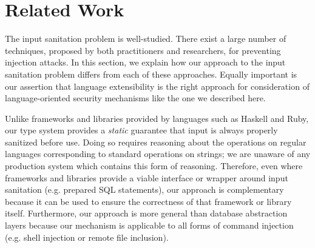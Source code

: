 \documentclass[10pt]{sigplanconf}
\theoremstyle{definition}
\begin{document}




\section{Related Work}\label{related}



The input sanitation problem is well-studied. There exist a large number of techniques, proposed by both practitioners and researchers, for preventing injection attacks. In this section, we explain how our approach to the input sanitation problem differs from each of these approaches. Equally important  is our assertion that language extensibility is the right approach for  consideration of language-oriented security mechanisms like the one we described here.

Unlike {frameworks and libraries} provided by languages such as Haskell and Ruby, our type system provides a \emph{static} guarantee that input is always properly sanitized before use. Doing so requires reasoning about the operations on regular languages corresponding to standard operations on strings; we are unaware of any production system which contains this form of reasoning. Therefore, even where frameworks and libraries provide a viable interface or wrapper around input sanitation (e.g. prepared SQL statements), our approach is complementary because it can be used to ensure the correctness of that framework or library itself. Furthermore, our approach is more general than database abstraction layers because our mechanism is applicable to all forms of command injection (e.g. shell injection or remote file inclusion).
\end{document}
